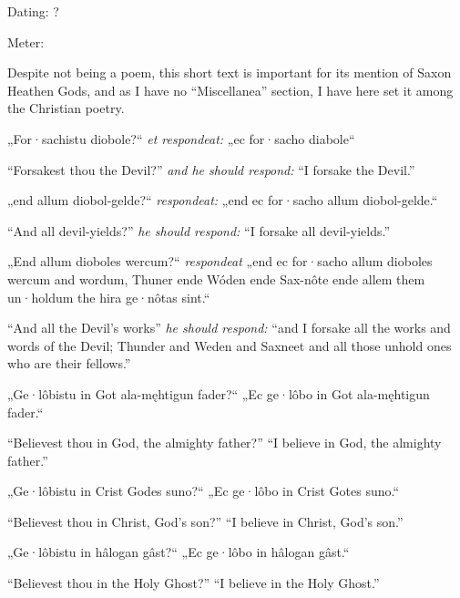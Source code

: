 
\begin{flushright}%
Dating: ?

Meter: \Fornyrdislag%
\end{flushright}%

Despite not being a poem, this short text is important for its mention of Saxon Heathen Gods, and as I have no “Miscellanea” section, I have here set it among the Christian poetry.

\sectionline

\bpg
\bpa „For·sachistu diobole?“ \emph{et respondeat:} „ec for·sacho diabole“\epa

\bpb “Forsakest thou the Devil?” \emph{and he should respond:} “I forsake the Devil.”\epb
\epg


\bpg
\bpa „end allum diobol-gelde?“ \emph{respondeat:} „end ec for·sacho allum diobol-gelde.“\epa

\bpb “And all devil-yields?” \emph{he should respond:} “I forsake all devil-yields.”\epb
\epg


\bpg
\bpa „End allum dioboles wercum?“ \emph{respondeat} „end ec for·sacho allum dioboles wercum and wordum, Thuner ende Wóden ende Sax-nôte ende allem them un·holdum the hira ge·nôtas sint.“\epa

\bpb “And all the Devil’s works” \emph{he should respond:} “and I forsake all the works and words of the Devil; Thunder and Weden and Saxneet and all those unhold ones who are their fellows.”\epb
\epg


\bpg
\bpa „Ge·lôbistu in Got ala-męhtigun fader?“ „Ec ge·lôbo in Got ala-męhtigun fader.“\epa

\bpb “Believest thou in God, the almighty father?” “I believe in God, the almighty father.”\epb
\epg


\bpg
\bpa „Ge·lôbistu in Crist Godes suno?“ „Ec ge·lôbo in Crist Gotes suno.“\epa

\bpb “Believest thou in Christ, God’s son?” “I believe in Christ, God’s son.”\epb
\epg


\bpg
\bpa „Ge·lôbistu in hâlogan gâst?“ „Ec ge·lôbo in hâlogan gâst.“\epa

\bpb “Believest thou in the Holy Ghost?” “I believe in the Holy Ghost.”\epb
\epg
